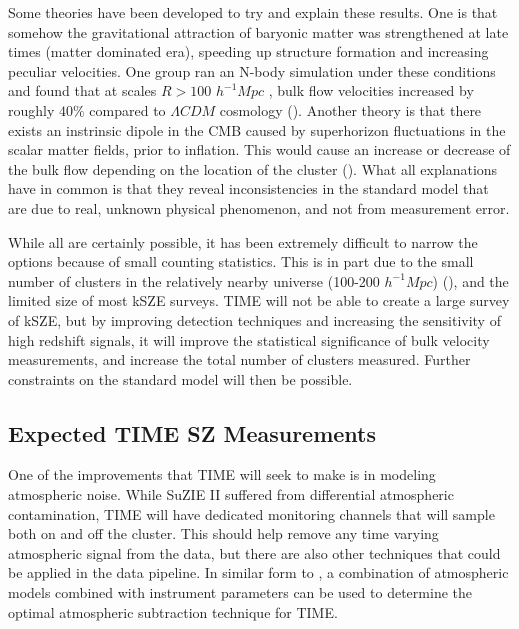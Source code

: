 \documentclass[manuscript]{aastex}
\begin{document}
Some theories have been developed to try and explain these results. One is that somehow the gravitational attraction of baryonic matter was strengthened at late times (matter dominated era), speeding up structure formation and increasing peculiar velocities. One group ran an N-body simulation under these conditions and found that at scales  \(R > 100\) \(h^{-1} Mpc\) , bulk flow velocities increased by roughly \(40\%\) compared to \(\Lambda CDM\) cosmology (\cite{Wyman2010}). Another theory is that there exists an instrinsic dipole in the CMB caused by superhorizon fluctuations in the scalar matter fields, prior to inflation. This would cause an increase or decrease of the bulk flow depending on the location of the cluster (\cite{Mak2011}).  What all explanations have in common is that they reveal inconsistencies in the standard model that are due to real, unknown physical phenomenon, and not from measurement error. 

While all are certainly possible, it has been extremely difficult to narrow the options because of small counting statistics. This is in part due to the small number of clusters in the relatively nearby universe (100-200 \(h^{-1} Mpc\)) (\cite{Lavaux2013}), and the limited size of most kSZE surveys. TIME will not be able to create a large survey of kSZE, but by improving detection techniques and increasing the sensitivity of high redshift signals, it will improve the statistical significance of bulk velocity measurements, and increase the total number of clusters measured. Further constraints on the standard model will then be possible.  

\subsection{Expected TIME SZ Measurements}

One of the improvements that TIME will seek to make is in modeling atmospheric noise. While SuZIE II suffered from differential atmospheric contamination, TIME will have dedicated monitoring channels that will sample both on and off the cluster. This should help remove any time varying atmospheric signal from the data, but there are also other techniques that could be applied in the data pipeline. In similar form to \cite{Sayers2010}, a combination of atmospheric models combined with instrument parameters can be used to determine the optimal atmospheric subtraction technique for TIME. 
\end{document}
